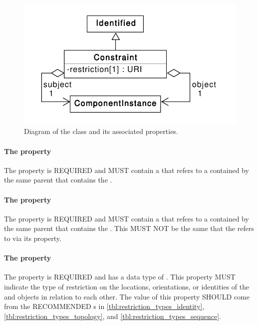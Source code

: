 \begin{figure}[ht]
\begin{center}
\includegraphics[scale=0.6]{uml/constraint}
\caption[]{Diagram of the  class and its associated properties.}
\label{uml:sequence_constraint}
\end{center}
\end{figure}

\paragraph{The  property}\label{sec:subject}
The  property is REQUIRED and MUST contain a  that refers to a  contained by the same parent  that contains the .

\paragraph{The  property}\label{sec:object}
The  property is REQUIRED and MUST contain a  that refers to a  contained by the same parent  that contains the . This  MUST NOT be the same  that the  refers to via its  property.

\paragraph{The  property}\label{sec:restriction}

The  property is REQUIRED and has a data type of . 
This property MUST indicate the type of restriction on the locations, orientations, or identities of the  and   objects in relation to each other. 
The  value of this property SHOULD come from the RECOMMENDED s in \ref{tbl:restriction_types_identity}, \ref{tbl:restriction_types_topology}, and \ref{tbl:restriction_types_sequence}.

